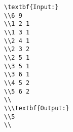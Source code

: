 \begin{verbatim}
\textbf{Input:}
\\6 9
\\1 2 1
\\1 3 1
\\2 4 1
\\2 3 2
\\2 5 1
\\3 5 1
\\3 6 1
\\4 5 2
\\5 6 2
\\
\\\textbf{Output:}
\\5
\\\end{verbatim}